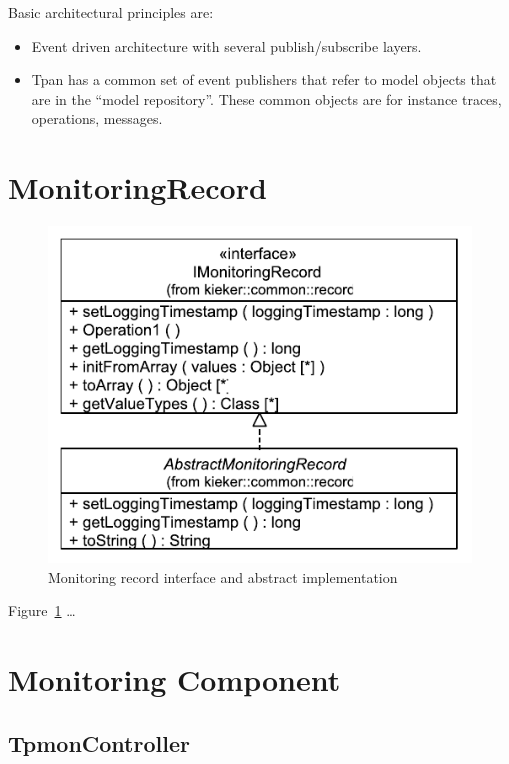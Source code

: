 \documentclass[12pt,journal,a4paper,twocolumn,final,oneside]{IEEEtran}%
\begin{document}
Basic architectural principles are:
\begin{itemize}
 \item Event driven architecture with several publish/subscribe layers.
 \item Tpan has a common set of event publishers that refer to model objects that are in the ``model repository''. These common objects are for instance traces, operations, messages.
\end{itemize}

\clearpage

\section{MonitoringRecord}

\begin{figure}[h]\centering
\includegraphics[scale=0.65]{figures/model/kieker_MonitoringRecord}%
\caption{Monitoring record interface and abstract implementation}
\label{fig:record:IMonitoringRecordAndAbstractMonitoringRecord}
\end{figure}

Figure~\ref{fig:record:IMonitoringRecordAndAbstractMonitoringRecord} \dots

\section{Monitoring Component}

\subsection{TpmonController}
\end{document}
